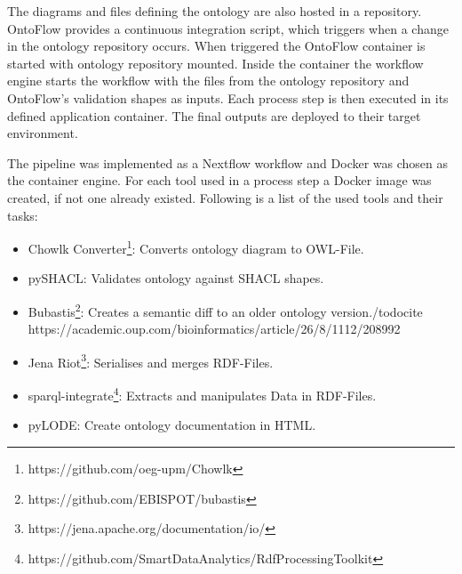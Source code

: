 \documentclass[sigconf]{acmart}
\begin{document}
The diagrams and files defining the ontology are also hosted in a repository.
OntoFlow provides a continuous integration script, which triggers when a change in the ontology repository occurs.
When triggered the OntoFlow container is started with ontology repository mounted.
Inside the container the workflow engine starts the workflow with the files from the ontology repository and OntoFlow's validation shapes as inputs.
Each process step is then executed in its defined application container.
The final outputs are deployed to their target environment.


The pipeline was implemented as a Nextflow workflow and Docker was chosen as the container engine.
For each tool used in a process step a Docker image was created, if not one already existed.
Following is a list of the used tools and their tasks:

\begin{itemize}
  \item Chowlk Converter\footnote{https://github.com/oeg-upm/Chowlk}: Converts ontology diagram to OWL-File.
  \item pySHACL: Validates ontology against SHACL shapes.
  \item Bubastis\footnote{https://github.com/EBISPOT/bubastis}: Creates a semantic diff to an older ontology version./todo{cite https://academic.oup.com/bioinformatics/article/26/8/1112/208992}
  \item Jena Riot\footnote{https://jena.apache.org/documentation/io/}: Serialises and merges RDF-Files.
  \item sparql-integrate\footnote{https://github.com/SmartDataAnalytics/RdfProcessingToolkit}: Extracts and manipulates Data in RDF-Files.
  \item pyLODE: Create ontology documentation in HTML.
\end{itemize}
\end{document}
